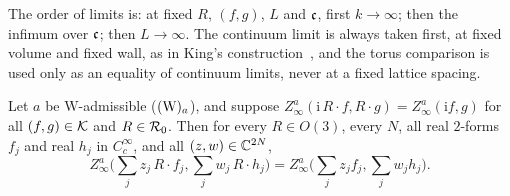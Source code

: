 \begin{remark}\label{rot:rem:order}
The order of limits is: at fixed $R$, $(f,g)$, $L$ and $\mathfrak c$, first $k\to\infty$; then the infimum over $\mathfrak c$; then $L\to\infty$. The
continuum limit is always taken first, at fixed volume and fixed wall, as in King's construction~\cite[p.~336]{K2}, and the torus
comparison is used only as an equality of continuum limits, never at a fixed lattice spacing.
\end{remark}

\begin{theorem}\label{rot:thm:closure}
Let $a$ be $\mathrm W$-admissible ($(\mathrm W)_{a}$), and suppose $Z^a_\infty(\mathrm i\,R\cdot f,R\cdot g)=Z^a_\infty(\mathrm if,g)$ for all $(f,g)\in\mathcal K$
and $R\in\mathcal R_0$. Then for every $R\in O(3)$, every $N$, all real $2$-forms $f_j$ and real $h_j$ in $C^\infty_c$, and all
$(z,w)\in\mathbb C^{2N}$,
\[
Z^a_\infty\Big(\sum_jz_j\,R\cdot f_j,\sum_jw_j\,R\cdot h_j\Big)=Z^a_\infty\Big(\sum_jz_jf_j,\sum_jw_jh_j\Big).
\]
\end{theorem}

